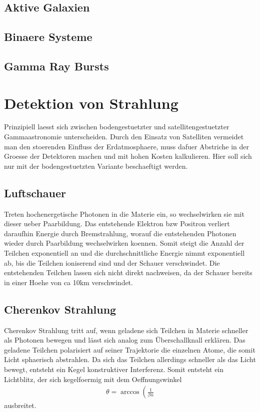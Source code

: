\subsection{Aktive Galaxien}
\subsection{Binaere Systeme}
\subsection{Gamma Ray Bursts}


\section{Detektion von Strahlung}
Prinzipiell laesst sich zwischen bodengestuetzter und satellitengestuetzter Gammaastronomie unterscheiden. Durch den Einsatz von Satelliten vermeidet man den stoerenden Einfluss der Erdatmosphaere, muss dafuer Abstriche in der Groesse der Detektoren machen und mit hohen Kosten kalkulieren. Hier soll sich nur mit der bodengestuetzten Variante beschaeftigt werden.

\subsection{Luftschauer}
Treten hochenergetische Photonen in die Materie ein, so wechselwirken sie mit dieser ueber Paarbildung. Das entstehende Elektron bzw Positron verliert daraufhin Energie durch Bremstrahlung, worauf die entstehenden Photonen wieder durch Paarbildung wechselwirken koennen. Somit steigt die Anzahl der Teilchen exponentiell an und die durchschnittliche Energie nimmt exponentiell ab, bis die Teilchen ioniserend sind und der Schauer verschwindet. Die entstehenden Teilchen lassen sich nicht direkt nachweisen, da der Schauer bereits in einer Hoehe von ca 10km verschwindet. %

\subsection{Cherenkov Strahlung}
Cherenkov Strahlung tritt auf, wenn geladene sich Teilchen in Materie schneller als Photonen bewegen und lässt sich analog zum Überschallknall erklären. Das geladene Teilchen polarisiert auf seiner Trajektorie die einzelnen Atome, die somit Licht sphaerisch abstrahlen. Da sich das Teilchen allerdings schneller als das Licht bewegt, entsteht ein Kegel konstruktiver Interferenz. Somit entsteht ein Lichtblitz, der sich kegelfoermig mit dem Oeffnungswinkel %
\begin{align}
\theta = \arccos\left(\frac{1}{\beta n}
\end{align}
ausbreitet.

